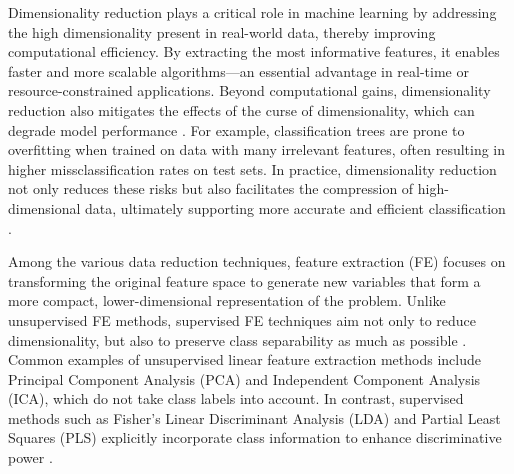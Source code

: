 \documentclass[11pt,a4paper]{article}
\begin{document}
Dimensionality reduction plays a critical role in machine learning by addressing the high dimensionality present in real-world data, thereby improving computational efficiency. By extracting the most informative features, it enables faster and more scalable algorithms---an essential advantage in real-time or resource-constrained applications.
Beyond computational gains, dimensionality reduction also mitigates the effects of the curse of dimensionality, which can degrade model performance \citep{hu2024tackling}. For example, classification trees are prone to overfitting when trained on data with many irrelevant features, often resulting in higher missclassification rates on test sets.
In practice, dimensionality reduction not only reduces these risks but also facilitates the compression of high-dimensional data, ultimately supporting more accurate and efficient classification \citep{garcia2023evolutionary}.

Among the various data reduction techniques, feature extraction (FE) focuses on transforming the original feature space to generate new variables that form a more compact, lower-dimensional representation of the problem. Unlike unsupervised FE methods, supervised FE techniques aim not only to reduce dimensionality, but also to preserve class separability as much as possible \citep{fukunaga2013introduction}.
Common examples of unsupervised linear feature extraction methods include Principal Component Analysis (PCA) and Independent Component Analysis (ICA), which do not take class labels into account. In contrast, supervised methods such as Fisher's Linear Discriminant Analysis (LDA) and Partial Least Squares (PLS) explicitly incorporate class information to enhance discriminative power \citep{james2013introduction}.
\end{document}
